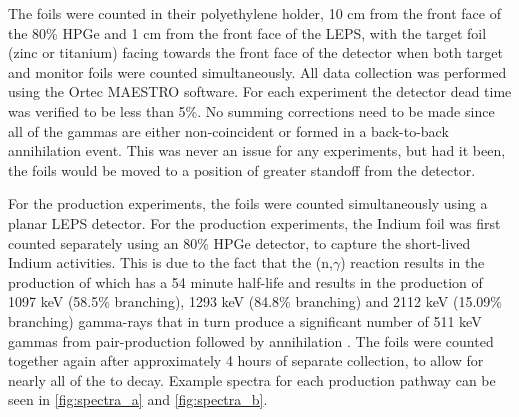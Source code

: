 \documentclass[5p]{elsarticle}
\begin{document}
The foils were counted in their polyethylene holder, 10 cm from the front face of the 80\% HPGe and 1 cm from the front face of the LEPS, with the target foil (zinc or titanium) facing towards the front face of the detector when both target and monitor foils were counted simultaneously. All data collection was performed using the Ortec MAESTRO software. For each experiment the detector dead time was verified to be less than 5\%.  No summing corrections need to be made since all of the gammas are either non-coincident or formed in a back-to-back annihilation event. This was never an issue for any experiments, but had it been, the foils would be moved to a position of greater standoff from the detector.  

For the   production experiments, the foils were counted simultaneously using a planar LEPS detector. For the  production experiments, the Indium foil was first counted separately using an 80\% HPGe detector, to capture the short-lived Indium activities. This is due to the fact that the (n,$\gamma$) reaction results in the production of  which has a 54 minute half-life and results in the production of 1097 keV (58.5\% branching), 1293 keV (84.8\% branching) and 2112 keV (15.09\% branching) gamma-rays that in turn produce a significant number of 511 keV gammas from pair-production followed by annihilation \cite{Blachot2010}. The foils were counted together again after approximately 4 hours of separate collection, to allow for nearly all of the  to decay. Example spectra for each production pathway can be seen in \autoref{fig:spectra_a} and \autoref{fig:spectra_b}.
\end{document}

